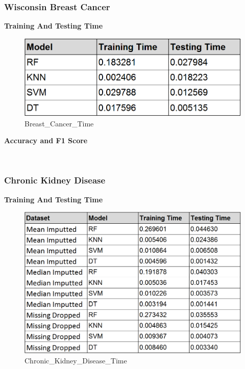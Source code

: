 \documentclass[11pt]{article}
\begin{document}
    \hypertarget{wisconsin-breast-cancer}{%
\subsubsection{Wisconsin Breast Cancer}\label{wisconsin-breast-cancer}}

    \textbf{Training And Testing Time}

    \begin{figure}
\centering
\includegraphics{images/Breast_Cancer_Time.PNG}
\caption{Breast\_Cancer\_Time}
\end{figure}

    \textbf{Accuracy and F1 Score}

    \begin{center}
    \end{center}
    { \hspace*{\fill} \\}
    
    \hypertarget{chronic-kidney-disease}{%
\subsubsection{Chronic Kidney Disease}\label{chronic-kidney-disease}}

    \textbf{Training And Testing Time}

    \begin{figure}
\centering
\includegraphics{images/Chronic_Kidney_Disease_Time.PNG}
\caption{Chronic\_Kidney\_Disease\_Time}
\end{figure}
\end{document}

